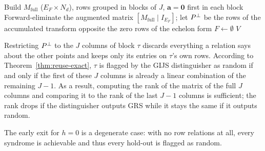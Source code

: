 \begin{algorithm}[H]
\caption{Hold-out reuse: all GIJS decisions of one trial}
\label{alg:reuse}
Build $M_{\mathrm{full}}$ ($E_F \times N_d$), rows grouped in blocks
of $J$, $\mathbf{a}=\mathbf{0}$ first in each block\;
Forward-eliminate the augmented matrix $[M_{\mathrm{full}} \mid
I_{E_F}]$; let $P^{\perp}$ be the rows of the accumulated transform
opposite the zero rows of the echelon form\;
$F \leftarrow \emptyset$\;
\Return $V$\;
\end{algorithm}
\smallskip
Restricting $P^{\perp}$ to the
$J$ columns of block $\tau$ discards everything a relation says
about the other points and keeps only its entries on $\tau$'s own
rows. According to Theorem~\ref{thm:reuse-exact}, $\tau$ is flagged by the GIJS distinguisher
as random if and only if
the first of these $J$ columns is already a linear
combination of the remaining $J-1$. 
As a result, computing the rank of the matrix of the full $J$ columns and comparing it to 
the rank of the last $J-1$ columns is sufficient; the rank drops if the distinguisher outputs GRS
while it stays the same if it outputs random.

The early exit for
$h = 0$ is a degenerate case: with no
row relations at all, every syndrome is achievable and thus every hold-out
is flagged as random.



